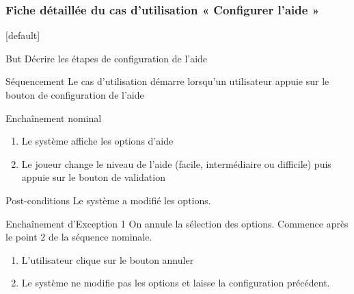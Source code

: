 \documentclass{beamer}
\begin{document}
\begin{frame}
  \frametitle{Fiche détaillée du cas d'utilisation « Configurer l’aide »}
  [default]
  \begin{block}{\footnotesize{But}}
    \scriptsize{Décrire les étapes de configuration de l’aide}
  \end{block}
  \pause
  \begin{block}{\footnotesize{Séquencement}}
    \scriptsize{Le cas d'utilisation démarre lorsqu’un utilisateur appuie sur le bouton de configuration de l’aide}
  \end{block}
  \pause
  \begin{block}{\footnotesize{Enchaînement nominal}}
    \begin{enumerate}    
      [circle]
      \item
        \scriptsize{Le système affiche les options d’aide}
      \item
        \scriptsize{Le joueur change le niveau de l’aide (facile, intermédiaire ou difficile) puis appuie sur le bouton de validation}
    \end{enumerate}
  \pause 
  \end{block}
  \begin{block}{\footnotesize{Post-conditions}}
    \scriptsize{Le système a modifié les options.}
  \pause
  \end{block}
  \begin{block}{\footnotesize{Enchaînement d’Exception 1}}
    \scriptsize{On annule la sélection des options. Commence après le point 2 de la séquence nominale.}
    \begin{enumerate}    
      [circle]
      \item
        \scriptsize{L’utilisateur clique sur le bouton annuler}
      \item
        \scriptsize{Le système ne modifie pas les options et laisse la configuration précédent.}
    \end{enumerate}
  \end{block}
\end{frame}
\end{document}
